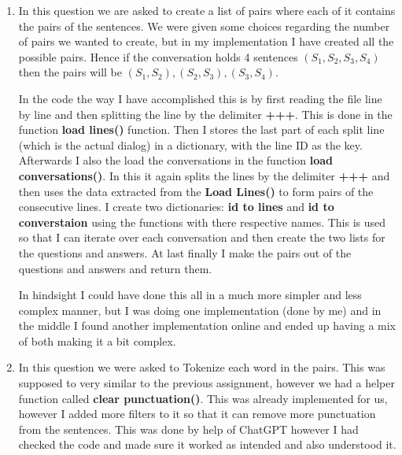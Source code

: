 \documentclass[a4paper]{article}
\begin{document}
\begin{enumerate}
    \item In this question we are asked to create a list of pairs where each of it contains the pairs of the sentences. We were given some choices regarding the number of pairs we wanted to create, but in my implementation I have created all the possible pairs. Hence if the conversation holds 4 sentences $(S_1, S_2, S_3, S_4)$ then the pairs will be $(S_1, S_2), (S_2, S_3), (S_3, S_4)$.

          In the code the way I have accomplished this is by first reading the file line by line and then splitting the line by the delimiter \textbf{+++}. This is done in the function \textbf{load lines()} function. Then I stores the last part of each split line (which is the actual dialog) in a dictionary, with the line ID as the key. Afterwards I also the load the conversations in the function \textbf{load conversations()}. In this it again splits the lines by the delimiter \textbf{+++} and then uses the data extracted from the \textbf{Load Lines()} to form pairs of the consecutive lines. I create two dictionaries: \textbf{id to lines} and \textbf{id to converstaion} using the functions with there respective names. This is used so that I can iterate over each conversation and then create the two lists for the questions and answers. At last finally I make the pairs out of the questions and answers and return them.

          In hindsight I could have done this all in a much more simpler and less complex manner, but I was doing one implementation (done by me) and in the middle I found another implementation online and ended up having a mix of both making it a bit complex.

    \item In this question we were asked to Tokenize each word in the pairs. This was supposed to very similar to the previous assignment, however we had a helper function called \textbf{clear punctuation()}. This was already implemented for us, however I added more filters to it so that it can remove more punctuation from the sentences. This was done by help of ChatGPT however I had checked the code and made sure it worked as intended and also understood it.


\end{enumerate}
\end{document}
